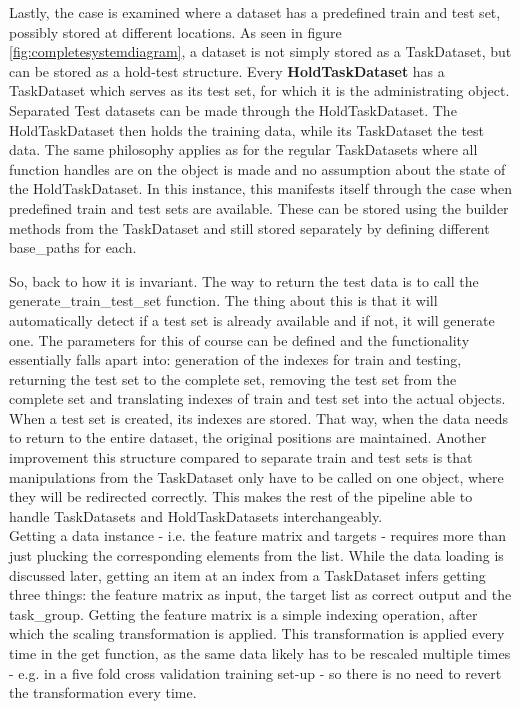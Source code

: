 Lastly, the case is examined where a dataset has a predefined train and test set, possibly stored at different locations. As seen in figure \ref{fig:completesystemdiagram}, a dataset is not simply stored as a TaskDataset, but can be stored as a hold-test structure. Every \textbf{HoldTaskDataset} has a  TaskDataset which serves as its test set, for which it is the administrating object. Separated Test datasets can be made through the HoldTaskDataset. The HoldTaskDataset then holds the training data, while its TaskDataset the test data.  The same philosophy applies as for the regular TaskDatasets where all function handles are on the object is made and no assumption about the state of the HoldTaskDataset. In this instance, this manifests itself through the case when predefined train and test sets are available. These can be stored using the builder methods from the TaskDataset and still stored separately by defining different base\_paths for each. 

So, back to how it is invariant. The way to return the test data is to call the generate\_train\_test\_set function. The thing about this is that it will automatically detect if a test set is already available and if not, it will generate one. The parameters for this of course can be defined and the functionality essentially falls apart into: generation of the indexes for train and testing, returning the test set to the complete set, removing the test set from the complete set and translating indexes of train and test set into the actual objects. When a test set is created, its indexes are stored. That way, when the data needs to return to the entire dataset, the original positions are maintained. Another improvement this structure compared to separate train and test sets is that manipulations from the TaskDataset only have to be called on one object, where they will be redirected correctly. This makes the rest of the pipeline able to handle TaskDatasets and HoldTaskDatasets interchangeably.  \\



Getting a data instance - i.e. the feature matrix and targets - requires more than just plucking the corresponding elements from the list. While the data loading is discussed later, getting an item at an index from a TaskDataset infers getting three things: the feature matrix as input, the target list as correct output and the task\_group. Getting the feature matrix is a simple indexing operation, after which the scaling transformation is applied. This transformation is applied every time in the get function, as the same data likely has to be rescaled multiple times - e.g. in a five fold cross validation training set-up - so there is no need to revert the transformation every time. \\

